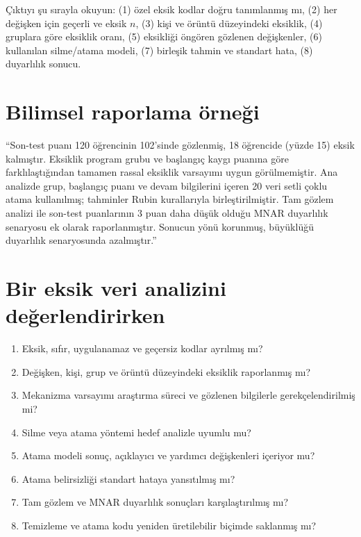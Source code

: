 \begin{outputguidebox}
Çıktıyı şu sırayla okuyun: (1) özel eksik kodlar doğru tanımlanmış mı,
(2) her değişken için geçerli ve eksik $n$, (3) kişi ve örüntü düzeyindeki
eksiklik, (4) gruplara göre eksiklik oranı, (5) eksikliği öngören gözlenen
değişkenler, (6) kullanılan silme/atama modeli, (7) birleşik tahmin ve standart
hata, (8) duyarlılık sonucu.
\end{outputguidebox}

\section{Bilimsel raporlama örneği}

``Son-test puanı 120 öğrencinin 102'sinde gözlenmiş, 18 öğrencide (yüzde 15)
eksik kalmıştır. Eksiklik program grubu ve başlangıç kaygı puanına göre
farklılaştığından tamamen rassal eksiklik varsayımı uygun görülmemiştir. Ana
analizde grup, başlangıç puanı ve devam bilgilerini içeren 20 veri setli çoklu
atama kullanılmış; tahminler Rubin kurallarıyla birleştirilmiştir. Tam gözlem
analizi ile son-test puanlarının 3 puan daha düşük olduğu MNAR duyarlılık
senaryosu ek olarak raporlanmıştır. Sonucun yönü korunmuş, büyüklüğü duyarlılık
senaryosunda azalmıştır.''

\section{Bir eksik veri analizini değerlendirirken}

\begin{enumerate}
  \item Eksik, sıfır, uygulanamaz ve geçersiz kodlar ayrılmış mı?
  \item Değişken, kişi, grup ve örüntü düzeyindeki eksiklik raporlanmış mı?
  \item Mekanizma varsayımı araştırma süreci ve gözlenen bilgilerle gerekçelendirilmiş mi?
  \item Silme veya atama yöntemi hedef analizle uyumlu mu?
  \item Atama modeli sonuç, açıklayıcı ve yardımcı değişkenleri içeriyor mu?
  \item Atama belirsizliği standart hataya yansıtılmış mı?
  \item Tam gözlem ve MNAR duyarlılık sonuçları karşılaştırılmış mı?
  \item Temizleme ve atama kodu yeniden üretilebilir biçimde saklanmış mı?
\end{enumerate}

